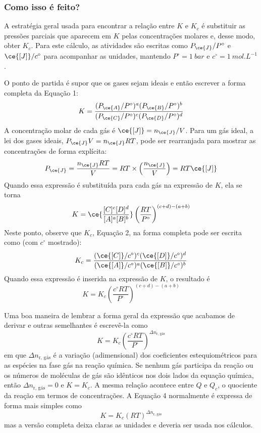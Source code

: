 \begin{derivation}

\subsubsection{Como isso é feito?}

A estratégia geral usada para encontrar a relação entre \(K\) e \(K_c\) é substituir as pressões parciais que aparecem em \(K\) pelas concentrações
molares e, desse modo, obter \(K_c\). Para este cálculo, as atividades são escritas como \(P_{\ce{J}}/P^\circ\) e \(\ce{[J]}/c^\circ\) para acompanhar
as unidades, mantendo \(P^\circ = \qty{1}{\unit{bar}}\) e \(c^\circ = \qty{1}{\unit{mol.L^{-1}}}\).

O ponto de partida é supor que os gases sejam ideais e então escrever a forma completa da Equação 1: \[
    K = \dfrac{ (P_{\ce{A}}/P^\circ)^a (P_{\ce{B}}/P^\circ)^b }{ (P_{\ce{C}}/P^\circ)^c (P_{\ce{D}}/P^\circ)^d }
\] A concentração molar de cada gás é \(\ce{[J]} = n_{\ce{J}}/V\). Para um gás ideal, a lei dos gases ideais, \(P_{\ce{J}}V = n_{\ce{J}}RT\), pode ser
rearranjada para mostrar as concentrações de forma explícita: \[
    P_{\ce{J}} 
        = \dfrac{ n_{\ce{J}}RT }{ V } 
        = RT \times \left( \dfrac{ n_{\ce{J}} }{ V } \right ) 
        = RT \ce{[J]}
\] Quando essa expressão é substituída para cada gás na expressão de \(K\), ela se torna \[
    K = \ce{\frac{ [C]^c [D]^d }{ [A]^a [B]^b } }
        \left( \dfrac{RT}{P^\circ} \right)^{ (c + d) - (a + b) } 
\] Neste ponto, observe que \(K_c\), Equação 2, na forma completa pode ser escrita como (com \(c^\circ\) mostrado): \[
    K_c = \frac{ (\ce{[C]}/c^\circ)^c (\ce{[D]}/c^\circ)^d }{ (\ce{[A]}/c^\circ)^a (\ce{[B]}/c^\circ)^b }
\] Quando essa expressão é inserida na expressão de \(K\), o resultado é \[
    K = K_c \left( \dfrac{ c^\circ RT }{ P^\circ } \right)^{ (c + d) - (a + b) }
\]

\end{derivation}

Uma boa maneira de lembrar a forma geral da expressão que acabamos de derivar e outras semelhantes é escrevê-la como \[
    K = K_c \left( \dfrac{ c^\circ RT }{ P^\circ } \right)^{ \Delta n_\text{r, gás} }
\tag{10a}
\] em que \(\Delta n_\text{r, gás}\) é a variação (adimensional) dos coeficientes estequiométricos para as espécies na fase gás na reação química. Se
nenhum gás participa da reação ou os números de moléculas de gás são idênticos nos dois lados da equação química, então \(\Delta n_\text{r, gás} = 0\)
e \(K = K_c\). A mesma relação acontece entre \(Q\) e \(Q_c\), o quociente da reação em termos de concentrações. A Equação 4 normalmente é expressa de
forma mais simples como \[
    K = K_c \left( RT \right)^{\Delta n_\text{r, gás}}
\tag{10b}
\] mas a versão completa deixa claras as unidades e deveria ser usada nos cálculos.


